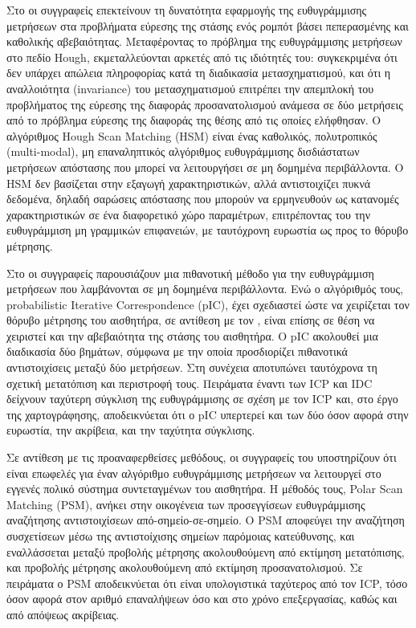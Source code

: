 Στο \cite{Censia} οι συγγραφείς επεκτείνουν τη δυνατότητα εφαρμογής της
ευθυγράμμισης μετρήσεων στα προβλήματα εύρεσης της στάσης ενός ρομπότ βάσει
πεπερασμένης και καθολικής αβεβαιότητας. Μεταφέροντας το πρόβλημα της
ευθυγράμμισης μετρήσεων στο πεδίο Hough, εκμεταλλεύονται αρκετές από τις
ιδιότητές του: συγκεκριμένα ότι δεν υπάρχει απώλεια πληροφορίας κατά τη
διαδικασία μετασχηματισμού, και ότι η αναλλοιότητα (invariance) του
μετασχηματισμού επιτρέπει την απεμπλοκή του προβλήματος της εύρεσης της
διαφοράς προσανατολισμού ανάμεσα σε δύο μετρήσεις από το πρόβλημα εύρεσης της
διαφοράς της θέσης από τις οποίες ελήφθησαν. Ο αλγόριθμος Hough Scan Matching
(HSM) είναι ένας καθολικός, πολυτροπικός (multi-modal), μη επαναληπτικός
αλγόριθμος ευθυγράμμισης δισδιάστατων μετρήσεων απόστασης που μπορεί να
λειτουργήσει σε μη δομημένα περιβάλλοντα. Ο HSM δεν βασίζεται στην εξαγωγή
χαρακτηριστικών, αλλά αντιστοιχίζει πυκνά δεδομένα, δηλαδή σαρώσεις απόστασης
που μπορούν να ερμηνευθούν ως κατανομές χαρακτηριστικών σε ένα διαφορετικό χώρο
παραμέτρων, επιτρέποντας του την ευθυγράμμιση μη γραμμικών επιφανειών, με
ταυτόχρονη ευρωστία ως προς το θόρυβο μέτρησης.

Στο \cite{Montesano2005} οι συγγραφείς παρουσιάζουν μια πιθανοτική μέθοδο για
την ευθυγράμμιση μετρήσεων που λαμβάνονται σε μη δομημένα περιβάλλοντα. Ενώ ο
αλγόριθμός τους, probabilistic Iterative Correspondence (pIC), έχει σχεδιαστεί
ώστε να χειρίζεται τον θόρυβο μέτρησης του αισθητήρα, σε αντίθεση με τον
\cite{Pfistera}, είναι επίσης σε θέση να χειριστεί και την αβεβαιότητα της
στάσης του αισθητήρα. O pIC ακολουθεί μια διαδικασία δύο βημάτων, σύμφωνα με
την οποία προσδιορίζει πιθανοτικά αντιστοιχίσεις μεταξύ δύο μετρήσεων. Στη
συνέχεια αποτυπώνει ταυτόχρονα τη σχετική μετατόπιση και περιστροφή τους.
Πειράματα έναντι των ICP και IDC δείχνουν ταχύτερη σύγκλιση της ευθυγράμμισης
σε σχέση με τον ICP και, στο έργο της χαρτογράφησης, αποδεικνύεται ότι ο pIC
υπερτερεί και των δύο όσον αφορά στην ευρωστία, την ακρίβεια, και την ταχύτητα
σύγκλισης.

Σε αντίθεση με τις προαναφερθείσες μεθόδους, οι συγγραφείς του \cite{Diosi2005}
υποστηρίζουν ότι είναι επωφελές για έναν αλγόριθμο ευθυγράμμισης μετρήσεων να
λειτουργεί στο εγγενές πολικό σύστημα συντεταγμένων του αισθητήρα. Η μέθοδός
τους, Polar Scan Matching (PSM), ανήκει στην οικογένεια των προσεγγίσεων
ευθυγράμμισης αναζήτησης αντιστοιχίσεων από-σημείο-σε-σημείο. O PSM αποφεύγει
την αναζήτηση συσχετίσεων μέσω της αντιστοίχισης σημείων παρόμοιας κατεύθυνσης,
και εναλλάσσεται μεταξύ προβολής μέτρησης ακολουθούμενη από εκτίμηση
μετατόπισης, και προβολής μέτρησης ακολουθούμενη από εκτίμηση προσανατολισμού.
Σε πειράματα ο PSM αποδεικνύεται ότι είναι υπολογιστικά ταχύτερος από τον ICP,
τόσο όσον αφορά στον αριθμό επαναλήψεων όσο και στο χρόνο επεξεργασίας, καθώς
και από απόψεως ακρίβειας.

